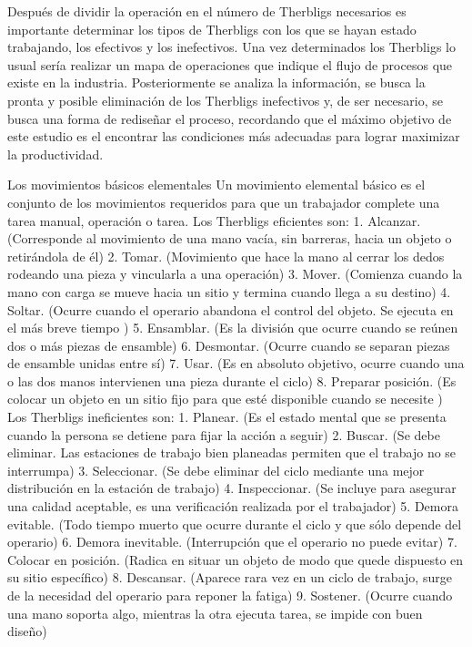 \documentclass[letterpaper,12pt,openright,oneside]{article}
\theoremstyle{plain}
\begin{document}
Después de dividir la operación en el número de Therbligs necesarios es importante determinar los tipos de Therbligs con los que se hayan estado trabajando, los efectivos y los inefectivos. Una vez determinados los Therbligs lo usual sería realizar un mapa de operaciones que indique el flujo de procesos que existe en la industria. Posteriormente se analiza la información, se busca la pronta y posible eliminación de los Therbligs inefectivos y, de ser necesario, se busca una forma de rediseñar el proceso, recordando que el máximo objetivo de este estudio es el encontrar las condiciones más adecuadas para lograr maximizar la productividad.

Los movimientos básicos elementales
Un movimiento elemental básico es el conjunto de los movimientos requeridos para que un trabajador complete una tarea manual, operación o tarea.
Los Therbligs eficientes son:
1. Alcanzar. (Corresponde al movimiento de una mano vacía, sin barreras, hacia un objeto o retirándola de él)
2. Tomar. (Movimiento que hace la mano al cerrar los dedos rodeando una pieza y vincularla a una operación)
3. Mover. (Comienza cuando la mano con carga se mueve hacia un sitio y termina cuando llega a su destino)
4. Soltar. (Ocurre cuando el operario abandona el control del objeto. Se ejecuta en el más breve tiempo )
5. Ensamblar. (Es la división que ocurre cuando se reúnen dos o más piezas de ensamble)
6. Desmontar. (Ocurre cuando se separan piezas de ensamble unidas entre sí)
7. Usar. (Es en absoluto objetivo, ocurre cuando una o las dos manos intervienen una pieza durante el ciclo)
8. Preparar posición. (Es colocar un objeto en un sitio fijo para que esté disponible cuando se necesite )
Los Therbligs ineficientes son:
1. Planear. (Es el estado mental que se presenta cuando la persona se detiene para fijar la acción a seguir)
2. Buscar. (Se debe eliminar. Las estaciones de trabajo bien planeadas permiten que el trabajo no se interrumpa)
3. Seleccionar. (Se debe eliminar del ciclo mediante una mejor distribución en la estación de trabajo)
4. Inspeccionar. (Se incluye para asegurar una calidad aceptable, es una verificación realizada por el trabajador)
5. Demora evitable. (Todo tiempo muerto que ocurre durante el ciclo y que sólo depende del operario)
6. Demora inevitable. (Interrupción que el operario no puede evitar)
7. Colocar en posición. (Radica en situar un objeto de modo que quede dispuesto en su sitio específico)
8. Descansar. (Aparece rara vez en un ciclo de trabajo, surge de la necesidad del operario para reponer la fatiga)
9. Sostener. (Ocurre cuando una mano soporta algo, mientras la otra ejecuta tarea, se impide con buen diseño)
\end{document}
